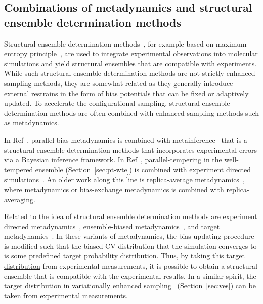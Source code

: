 \documentclass[9pt,review]{livecoms}
\begin{document}
\subsection{Combinations of metadynamics and structural ensemble determination methods}

Structural ensemble determination methods~\cite{Bonomi_StructEnsembleDeterm_Review_COSB2017,Cesari_MaximumEntropyPrinciple_Review_Comp2018,Bottaro_Science2018}, for example based on maximum entropy principle~\cite{Pitera_MaxEnt_JCTC2012,Roux_MaxEnt_JCP2013}, are used to integrate experimental observations into molecular simulations and yield structural ensembles that are compatible with experiments. While such structural ensemble determination methods are not strictly enhanced sampling methods, they are somewhat related as they generally introduce external restrains in the form of bias potentials that can be fixed or \hyperlink{ref:Adaptive} {adaptively} updated. To accelerate the configurational sampling, structural ensemble determination methods are often combined with enhanced sampling methods such as metadynamics.


In Ref~\cite{Bonomi_MetadynamicMetainference_SciRep2016}, parallel-bias metadynamics is combined with metainference~\cite{Bonomi_Metainference_SciAdv2016} that is a structural ensemble determination methods that incorporates experimental errors via a Bayesian inference framework. In Ref~\cite{Amirkulova_PTWTE-EDS_JPCB2020}, parallel-tempering in the well-tempered ensemble (Section~\ref{sec:pt-wte}) is combined with experiment directed simulations~\cite{White_EDS_JCTC2014}.
An older work along this line is replica-average metadynamics~\cite{Camilloni_RAM_2013,Camilloni_RAM-2_JACS20214}, where metadynamics or bias-exchange metadynamics is combined with replica-averaging.

Related to the idea of structural ensemble determination methods are experiment directed metadynamics~\cite{White_EDM_2015}, ensemble-biased metadynamics~\cite{Marinelli_EnsembleBiased_2015}, and target metadynamics~\cite{GilLey_TargetMetaD_2016}. In these variants of metadynamics, the bias updating procedure is modified such that the biased CV distribution that the simulation converges to is some predefined \hyperlink{ref:targetdist}{target probability distribution}. Thus, by taking this \hyperlink{ref:targetdist}{target distribution} from experimental measurements, it is possible to obtain a structural ensemble that is compatible with the experimental results. In a similar spirit, the \hyperlink{ref:targetdist}{target distribution} in variationally enhanced sampling~\cite{Valsson_VES_PRL_2014,Valsson2020Handbook_VES} (Section~\ref{sec:ves}) can be taken from experimental measurements.
\end{document}

